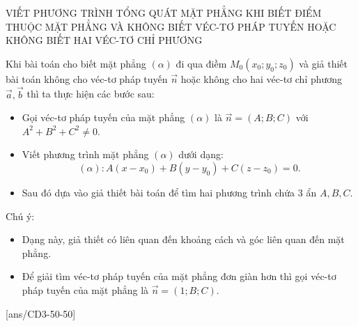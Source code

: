 \begin{dang}{VIẾT PHƯƠNG TRÌNH TỔNG QUÁT MẶT PHẲNG KHI BIẾT ĐIỂM THUỘC MẶT PHẲNG VÀ KHÔNG BIẾT VÉC-TƠ PHÁP TUYẾN HOẶC KHÔNG BIẾT HAI VÉC-TƠ CHỈ PHƯƠNG}
\end{dang}
\begin{tomtat}
	Khi bài toán cho biết mặt phẳng $(\alpha)$ đi qua điềm $M_0\left(x_0 ; y_0 ; z_0\right)$ và giả thiết bài toán không cho véc-tơ pháp tuyến $\overrightarrow{n}$ hoặc không cho hai véc-tơ chỉ phương $\overrightarrow{a}, \overrightarrow{b}$ thì ta thực hiện các bước sau:
	\begin{itemize}
		\item Gọi véc-tơ pháp tuyến của mặt phẳng $(\alpha)$ là $\overrightarrow{n}=(A ; B ; C)$ với $A^2+B^2+C^2 \neq 0$.
		\item Viết phương trình mặt phẳng $(\alpha)$ dưới dạng:
		$$
		(\alpha)\colon A\left(x-x_0\right)+B\left(y-y_0\right)+C\left(z-z_0\right)=0.
		$$
		\item Sau đó dựa vào giả thiết bài toán để tìm hai phương trình chứa 3 ẩn $A, B, C$.
	\end{itemize}
	Chú ý:
	\begin{itemize}
		\item Dạng này, giả thiết có liên quan đến khoảng cách và góc liên quan đến mặt phẳng.
		\item Để giải tìm véc-tơ pháp tuyến của mặt phẳng đơn giàn hơn thì gọi véc-tơ pháp tuyến của mặt phẳng là $\overrightarrow{n}=(1 ; B ; C)$.
	\end{itemize}
\end{tomtat}

[ans/CD3-50-50]
\TN

